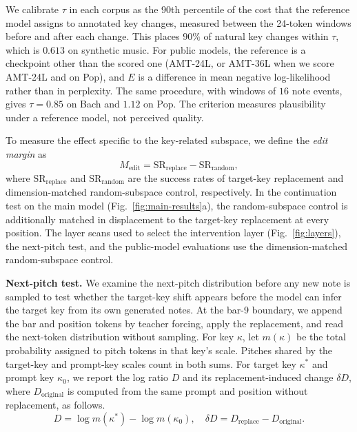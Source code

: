 \documentclass{article}
\begin{document}
We calibrate $\tau$ in each corpus as the 90th percentile of the cost that the reference model assigns to annotated key changes, measured between the 24-token windows before and after each change.
This places $90\%$ of natural key changes within $\tau$, which is $0.613$ on synthetic music.
For public models, the reference is a checkpoint other than the scored one (AMT-24L, or AMT-36L when we score AMT-24L and on Pop), and $E$ is a difference in mean negative log-likelihood rather than in perplexity.
The same procedure, with windows of $16$ note events, gives $\tau = 0.85$ on Bach and $1.12$ on Pop.
The criterion measures plausibility under a reference model, not perceived quality.

To measure the effect specific to the key-related subspace, we define the \emph{edit margin} as
\begin{equation}
M_{\mathrm{edit}}
=
\mathrm{SR}_{\mathrm{replace}}
-
\mathrm{SR}_{\mathrm{random}},
\label{eq:edit_margin}
\end{equation}
where $\mathrm{SR}_{\mathrm{replace}}$ and $\mathrm{SR}_{\mathrm{random}}$ are the success rates of target-key replacement and dimension-matched random-subspace control, respectively.
In the continuation test on the main model (Fig.~\ref{fig:main-results}a), the random-subspace control is additionally matched in displacement to the target-key replacement at every position.
The layer scans used to select the intervention layer (Fig.~\ref{fig:layers}), the next-pitch test, and the public-model evaluations use the dimension-matched random-subspace control.

\noindent\textbf{Next-pitch test.}
We examine the next-pitch distribution before any new note is sampled to test whether the target-key shift appears before the model can infer the target key from its own generated notes.
At the bar-9 boundary, we append the bar and position tokens by teacher forcing, apply the replacement, and read the next-token distribution without sampling.
For key $\kappa$, let $m(\kappa)$ be the total probability assigned to pitch tokens in that key's scale.
Pitches shared by the target-key and prompt-key scales count in both sums.
For target key $\kappa^*$ and prompt key $\kappa_0$, we report the log ratio $D$ and its replacement-induced change $\delta D$, where $D_{\mathrm{original}}$ is computed from the same prompt and position without replacement, as follows.
\begin{equation}
D = \log m(\kappa^*) - \log m(\kappa_0),
\quad
\delta D = D_{\mathrm{replace}} - D_{\mathrm{original}}.
\label{eq:logratio}
\end{equation}
\end{document}
